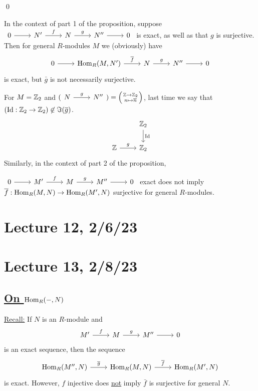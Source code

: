 \documentclass[x11names,reqno,14pt]{extarticle}
\begin{document}
\qed

\rem In the context of part 1 of the proposition, suppose $\exactshort{N'}{f}{N}{g}{N''}$ is exact, as well as that $g$ is surjective. Then for general $R$-modules $M$ we (obviously) have
\[
\begin{tikzcd}
0\ar[r]&\Hom_R(M, N')\ar[r, "\bar{f}"] & N\ar[r, "g"] & N''\ar[r] & 0 
\end{tikzcd}
\]
is exact, but $\bar{g}$ is not necessarily surjective.

\exm

For $M = \mathbb{Z}_2$ and $(\begin{tikzcd}N\ar[r, "g"]&N''\end{tikzcd}) = \left({{\Z\to\Z_2}\atop{n\mapsto\bar{n}}}\right)$, last time we say that $(\operatorname{\mathrm{Id}}:\mathbb{Z}_2\to\mathbb{Z}_2)\not\in\Im(\overline{g})$. 
\[
\begin{tikzcd}
&\Z_2\ar[d, "\Id"] \\
\Z\ar[r, "g"]&\Z_2
\end{tikzcd}
\]
Similarly, in the context of part 2 of the proposition, 

$\exactshort{M'}{f}{M}{g}{M''}$ exact does not imply $\overline{f}:{\mathrm{Hom}}_R(M, N)\to{\mathrm{Hom}}_R(M', N)$ surjective for general $R$-modules. 

\section*{Lecture 12, 2/6/23}

\section*{Lecture 13, 2/8/23}

\subsection*{\underline{On ${\mathrm{Hom}}_R(-, N)$}}

\underline{Recall:} If $N$ is an $R$-module and 
\[
\begin{tikzcd} M'\ar[r, "f"]&M\ar[r, "g"]&M''\ar[r]&0\end{tikzcd}
\]
is an exact sequence, then the sequence 
\[
\begin{tikzcd}\Hom_R(M'', N)\ar[r, "\bar{g}"]&\Hom_R(M, N) \ar[r, "\bar{f}"]& \Hom_R(M', N)\end{tikzcd}
\]
is exact. However, $f$ injective does \underline{not} imply $\bar{f}$ is surjective for general $N$. 

\end{document}
